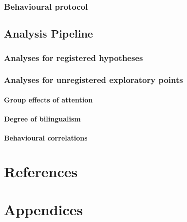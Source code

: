 \documentclass[man]{apa6}
\let\oldparagraph\paragraph
\renewcommand{\paragraph}[1]{\oldparagraph{#1}\mbox{}}
\begin{document}
\hypertarget{behavioural-protocol}{%
\subsubsection{Behavioural protocol}\label{behavioural-protocol}}

\hypertarget{analysis-pipeline}{%
\subsection{Analysis Pipeline}\label{analysis-pipeline}}

\hypertarget{analyses-for-registered-hypotheses}{%
\subsubsection{Analyses for registered hypotheses}\label{analyses-for-registered-hypotheses}}

\hypertarget{analyses-for-unregistered-exploratory-points}{%
\subsubsection{Analyses for unregistered exploratory points}\label{analyses-for-unregistered-exploratory-points}}

\hypertarget{group-effects-of-attention}{%
\paragraph{Group effects of attention}\label{group-effects-of-attention}}

\hypertarget{degree-of-bilingualism}{%
\paragraph{Degree of bilingualism}\label{degree-of-bilingualism}}

\hypertarget{behavioural-correlations}{%
\paragraph{Behavioural correlations}\label{behavioural-correlations}}

\hypertarget{references}{%
\section{References}\label{references}}

\hypertarget{appendices}{%
\section{Appendices}\label{appendices}}
\end{document}
